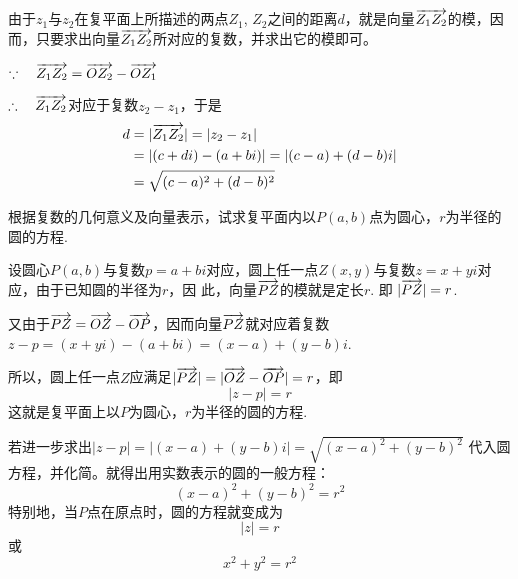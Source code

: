 \begin{solution}
    由于$z_1$与$z_2$在复平面上所描述的两点$Z_1$, $Z_2$之间的距离$d$，就是向量$\overrightarrow{Z_1Z_2}$的模，因而，只要求出向量$\overrightarrow{Z_1Z_2}$所对应的复数，并求出它的模即可。

    $\because\quad \overrightarrow{Z_1Z_2}=\overrightarrow{OZ_2}-\overrightarrow{OZ_1}$

$\therefore\quad \overrightarrow{Z_1Z_2}$对应于复数$z_2-z_1$，于是
\[\begin{split}
d&=|\overrightarrow{Z_1Z_2}|=|z_2-z_1|\\
&=|(c+di)-(a+bi)|=|(c-a)+(d-b)i|\\
&=\sqrt{(c-a)^2+(d-b)^2}    
\end{split}\]
\end{solution}

\begin{example}
    根据复数的几何意义及向量表示，试求复平面内以$P(a,b)$点为圆心，$r$为半径的圆的方程.
\end{example}

\begin{figure}[htp]
    \centering
{}
    \caption{}
\end{figure}


\begin{solution}
    设圆心$P(a,b)$与复数$p=a+bi$对应，圆上任一点$Z(x,y)$与复数$z=x+yi$对应，由于已知圆的半径为$r$，因
此，向量$\overrightarrow{PZ}$的模就是定长$r$. 即
$|\overrightarrow{PZ}|=r$.

又由于$\overrightarrow{PZ}=\overrightarrow{OZ}-\overrightarrow{OP}$，因而向量$\overrightarrow{PZ}$就对应着复数$z-p=(x+yi)-(a+bi)=(x-a)+(y-b)i$.

所以，圆上任一点$Z$应满足$|\overrightarrow{PZ}|=|\overrightarrow{OZ}-\overrightarrow{OP}|=r$，即
\[|z-p|=r\]
这就是复平面上以$P$为圆心，$r$为半径的圆的方程.

若进一步求出$|z-p|=|(x-a)+(y-b)i|
=\sqrt{(x-a)^2+(y-b)^2}$
代入圆方程，并化简。就得出用实数表示的圆的一般方程：
\[(x-a)^2+(y-b)^2=r^2\]
特别地，当$P$点在原点时，圆的方程就变成为
$$|z|=r$$
或
$$x^2+y^2=r^2$$
\end{solution}

